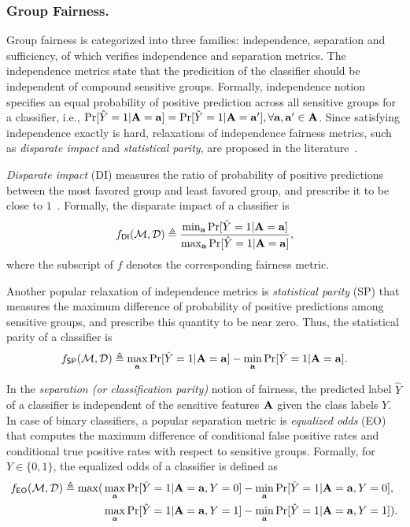 \subsubsection{Group Fairness.} Group fairness is categorized into three families: independence, separation and sufficiency, of which {\justicia} verifies independence and separation metrics. 
The independence metrics state that the predicition of the classifier should be independent of compound sensitive groups. Formally, independence notion specifies an equal probability of positive prediction across all sensitive groups for a classifier, i.e., $\Pr[\hat{Y} =1 | \mathbf{A} =  \mathbf{a}]  =  \Pr[\hat{Y} =1 | \mathbf{A} =  \mathbf{a}'] , \forall \mathbf{a}, \mathbf{a}' \in \mathbf{A}$.
Since satisfying independence exactly is hard, relaxations of independence fairness metrics, such as \textit{disparate impact} and \textit{statistical parity}, are proposed in the literature~\cite{dwork2012fairness,feldman2015certifying}.

\textit{Disparate impact} (DI) measures the ratio of probability of positive predictions between the most favored group and least favored group, and prescribe it to be close to $1$~\cite{feldman2015certifying}.  Formally, the disparate impact of a classifier is 
\[
f_{\mathsf{DI}}(\mathcal{M}, \mathcal{D}) \triangleq \frac{\min_{\mathbf{a}} \Pr[\hat{Y} =1 | \mathbf{A} =  \mathbf{a}]}{\max_{\mathbf{a}} \Pr[\hat{Y} =1 | \mathbf{A} =  \mathbf{a}]},
\]
where the subscript of $ f $ denotes the corresponding fairness metric.

Another popular relaxation of independence metrics  is \textit{statistical parity} (SP) that measures the maximum difference of probability of positive predictions among sensitive groups, and prescribe this quantity to be near zero. Thus, the statistical parity of  a classifier is 
\[ f_{\mathsf{SP}}(\mathcal{M}, \mathcal{D}) \triangleq \max_{\mathbf{a}}\Pr[\hat{Y} =1 | \mathbf{A} = \mathbf{a}] - \min_{\mathbf{a}}\Pr[\hat{Y} =1 | \mathbf{A} = \mathbf{a}]. \]



In the \textit{separation (or classification parity)} notion of fairness, the predicted label $\hat{Y}$ of a classifier is independent of the sensitive features $\mathbf{A}$ given the class labels $Y$. In case of binary classifiers, a popular separation metric is \textit{equalized odds} (EO)~\cite{hardt2016equality} that computes the maximum difference of conditional false positive rates  and conditional true positive rates  with respect to sensitive groups. Formally,  for $ Y \in \{0,1\} $,  the equalized odds of a classifier is defined as 
\begin{align*}
f_{\mathsf{EO}}(\mathcal{M}, \mathcal{D})  \triangleq \max(&\max_{\mathbf{a}}\Pr[\hat{Y} =1 | \mathbf{A} = \mathbf{a}, Y = 0] - \min_{\mathbf{a}}\Pr[\hat{Y} =1 | \mathbf{A} = \mathbf{a}, Y = 0], \\
&\max_{\mathbf{a}}\Pr[\hat{Y} =1 | \mathbf{A} = \mathbf{a}, Y = 1] - \min_{\mathbf{a}}\Pr[\hat{Y} =1 | \mathbf{A} = \mathbf{a}, Y = 1]). 
\end{align*}


